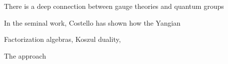 \documentclass[10pt]{article}
\title{}
\author{Brian R. Williams}
\begin{document}
\maketitle

There is a deep connection between gauge theories and quantum groups 

In the seminal work, Costello \cite{CosInt, CosYangian} has shown how the Yangian 

Factorization algebras, Koszul duality, 

The approach 


%
%
%  
%
\end{document}

